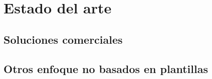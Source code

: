 
\chapter{Estado del arte}
\label{chap:estado-arte}

\section{Soluciones comerciales}

\section{Otros enfoque no basados en plantillas}

